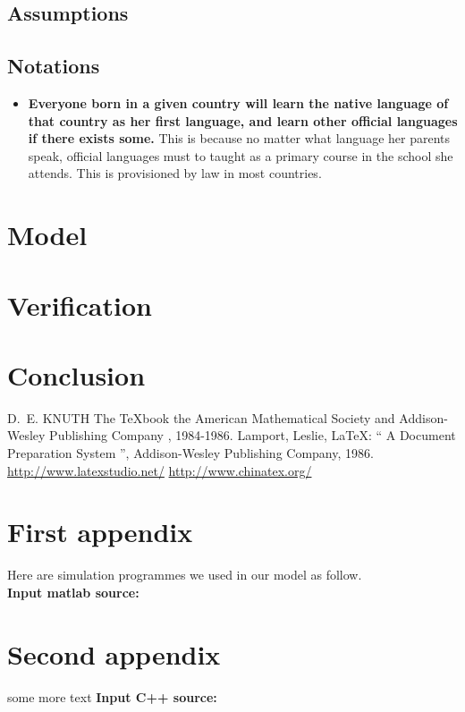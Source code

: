 \documentclass{mcmthesis}
\begin{document}
\subsection{Assumptions}
\subsection{Notations}
\begin{itemize}
    \item \textbf{Everyone born in a given country will learn the native language of that country as her first language, and learn other official languages if there exists some.} This is because no matter what language her parents speak, official languages must to taught as a primary course in the school she attends. This is provisioned by law in most countries.
\end{itemize}


\section{Model}
\section{Verification}
\section{Conclusion}

\begin{thebibliography}{99}
 D.~E. KNUTH   The \TeX{}book  the American
Mathematical Society and Addison-Wesley
Publishing Company , 1984-1986.
Lamport, Leslie,  \LaTeX{}: `` A Document Preparation System '',
Addison-Wesley Publishing Company, 1986.
\url{http://www.latexstudio.net/}
\url{http://www.chinatex.org/}
\end{thebibliography}

\begin{appendices}

\section{First appendix}

\lipsum[13]

Here are simulation programmes we used in our model as follow.\\

\textbf{\textcolor[rgb]{0.98,0.00,0.00}{Input matlab source:}}


\section{Second appendix}

some more text \textcolor[rgb]{0.98,0.00,0.00}{\textbf{Input C++ source:}}


\end{appendices}
\end{document}
